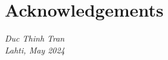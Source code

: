 \section*{Acknowledgements}






\textit{Duc Thinh Tran} \\
\textit{Lahti, May 2024}



\clearpage %

